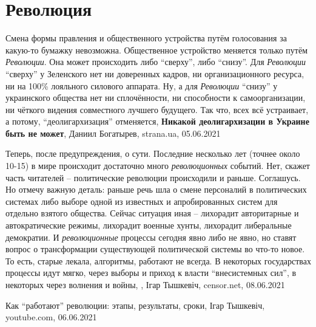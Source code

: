  
 
 
 
 
\chapter{Революция}
\label{sec:slova.revolucia}

Смена формы правления и общественного устройства путём голосования за какую-то
бумажку невозможна. Общественное устройство меняется только путём
\emph{Революции}. Она может происходить либо \enquote{сверху}, либо
\enquote{снизу}. Для \emph{Революции} \enquote{сверху} у Зеленского нет ни
доверенных кадров, ни организационного ресурса, ни на 100\% лояльного силового
аппарата. Ну, а для \emph{Революции} \enquote{снизу} у украинского общества нет
ни сплочённости, ни способности к самоорганизации, ни чёткого видения
совместного лучшего будущего. Так что, всех всё устраивает, а потому,
\enquote{деолигархизация} отменяется,
\textbf{Никакой деолигархизации в Украине быть не может},
Даниил Богатырев, strana.ua, 05.06.2021

Теперь, после предупреждения, о сути. Последние несколько лет (точнее около
10-15) в мире происходит достаточно много \emph{революционных} событий. Нет,
скажет часть читателей – политические революции происходили и раньше.
Соглашусь. Но отмечу важную деталь: раньше речь шла о смене персоналий в
политических системах либо выборе одной из известных и апробированных систем
для отдельно взятого общества. Сейчас ситуация иная – лихорадит авторитарные и
автократические режимы, лихорадит военные хунты, лихорадит либеральные
демократии.  И \emph{революционные} процессы сегодня явно либо не явно, но
ставят вопрос о трансформации существующей политической системы во что-то
новое. То есть, старые лекала, алгоритмы, работают не всегда. В некоторых
государствах процессы идут мягко, через выборы и приход к власти
\enquote{внесистемных сил}, в некоторых через волнения и войны,
, Ігар Тышкевіч, censor.net, 08.06.2021

Как \enquote{работают} революции: этапы, результаты, сроки, Ігар Тышкевіч, youtube.com, 06.06.2021

